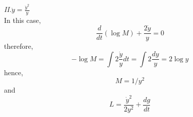 \documentclass[14pt]{extarticle}
\begin{document}
\textit{II.$\ddot{y}=\frac{\dot{y}^{2}}{y}$} \\
In this case,\\
\begin{equation}
\frac{d}{d t}(\log M)+\frac{2 \dot{y}}{y}=0
\end{equation}
therefore, \\
\begin{equation}
-\log M=\int 2 \frac{\dot{y}}{y} d t=\int 2 \frac{d y}{y}=2 \log y
\end{equation}
hence,\\
\begin{equation}
M=1 / y^{2}
\end{equation}
and \\
\begin{equation}
L=\frac{\dot{y}^{2}}{2 y^{2}}+\frac{d g}{d t}
\end{equation}\\ \\
\pagebreak
\end{document}
